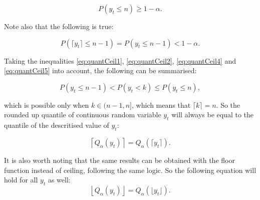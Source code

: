 \documentclass[]{elsarticle} %
\begin{document}
\begin{equation} \label{eq:quantCeil4}
    P \left(y_t \leq n \right) \geq 1 - \alpha .
\end{equation}

Note also that the following is true:

\begin{equation} \label{eq:quantCeil5}
    P \left(\lceil y_t \rceil \leq n-1 \right) = P \left(y_t \leq n-1 \right) < 1 - \alpha .
\end{equation}

Taking the inequalities \eqref{eq:quantCeil1}, \eqref{eq:quantCeil2}, \eqref{eq:quantCeil4} and \eqref{eq:quantCeil5} into account, the following can be summarised:

\begin{equation} \label{eq:quantCeil6}
    P \left(y_t \leq n-1 \right) < P \left(y_t < k \right) \leq P \left(y_t \leq n \right) ,
\end{equation}

which is possible only when \(k \in (n-1, n]\), which means that \(\lceil k \rceil = n\). So the rounded up quantile of continuous random variable \(y_t\) will always be equal to the quantile of the descritised value of \(y_t\):

\begin{equation} \label{eq:ceilingAndQuantiles1}
    \left \lceil Q_\alpha(y_t) \right \rceil = Q_\alpha \left(\lceil y_t \rceil \right) .
\end{equation}

It is also worth noting that the same results can be obtained with the floor function instead of ceiling, following the same logic. So the following equation will hold for all \(y_t\) as well:
\begin{equation} \label{eq:floorAndQuantiles1}
    \left \lfloor Q_\alpha(y_t) \right \rfloor = Q_\alpha \left(\lfloor y_t \rfloor \right) .
\end{equation}

\renewcommand\refname{References}

\end{document}
